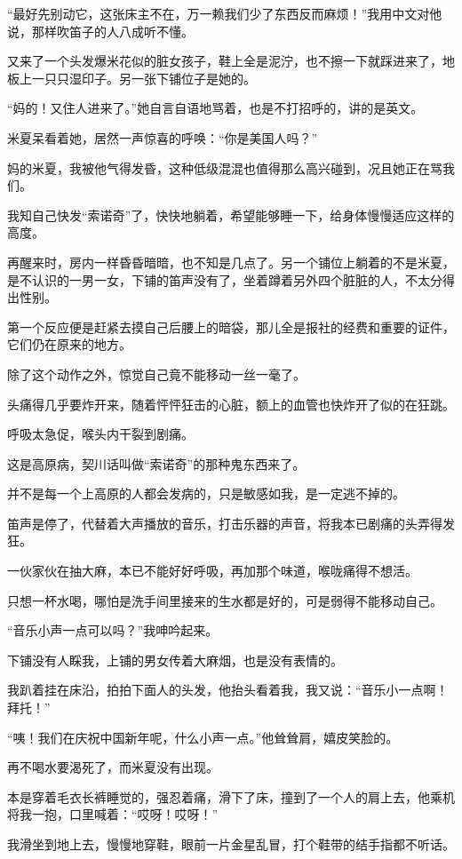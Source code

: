 \par “最好先别动它，这张床主不在，万一赖我们少了东西反而麻烦！”我用中文对他说，那样吹笛子的人八成听不懂。
\par 又来了一个头发爆米花似的脏女孩子，鞋上全是泥泞，也不擦一下就踩进来了，地板上一只只湿印子。另一张下铺位子是她的。
\par “妈的！又住人进来了。”她自言自语地骂着，也是不打招呼的，讲的是英文。
\par 米夏呆看着她，居然一声惊喜的呼唤：“你是美国人吗？”
\par 妈的米夏，我被他气得发昏，这种低级混混也值得那么高兴碰到，况且她正在骂我们。
\par 我知自己快发“索诺奇”了，快快地躺着，希望能够睡一下，给身体慢慢适应这样的高度。
\par 再醒来时，房内一样昏昏暗暗，也不知是几点了。另一个铺位上躺着的不是米夏，是不认识的一男一女，下铺的笛声没有了，坐着蹲着另外四个脏脏的人，不太分得出性别。
\par 第一个反应便是赶紧去摸自己后腰上的暗袋，那儿全是报社的经费和重要的证件，它们仍在原来的地方。
\par 除了这个动作之外，惊觉自己竟不能移动一丝一毫了。
\par 头痛得几乎要炸开来，随着怦怦狂击的心脏，额上的血管也快炸开了似的在狂跳。
\par 呼吸太急促，喉头内干裂到剧痛。
\par 这是高原病，契川话叫做“索诺奇”的那种鬼东西来了。
\par 并不是每一个上高原的人都会发病的，只是敏感如我，是一定逃不掉的。
\par 笛声是停了，代替着大声播放的音乐，打击乐器的声音，将我本已剧痛的头弄得发狂。
\par 一伙家伙在抽大麻，本已不能好好呼吸，再加那个味道，喉咙痛得不想活。
\par 只想一杯水喝，哪怕是洗手间里接来的生水都是好的，可是弱得不能移动自己。
\par “音乐小声一点可以吗？”我呻吟起来。
\par 下铺没有人睬我，上铺的男女传着大麻烟，也是没有表情的。
\par 我趴着挂在床沿，拍拍下面人的头发，他抬头看着我，我又说：“音乐小一点啊！拜托！”
\par “咦！我们在庆祝中国新年呢，什么小声一点。”他耸耸肩，嬉皮笑脸的。
\par 再不喝水要渴死了，而米夏没有出现。
\par 本是穿着毛衣长裤睡觉的，强忍着痛，滑下了床，撞到了一个人的肩上去，他乘机将我一抱，口里喊着：“哎呀！哎呀！”
\par 我滑坐到地上去，慢慢地穿鞋，眼前一片金星乱冒，打个鞋带的结手指都不听话。
